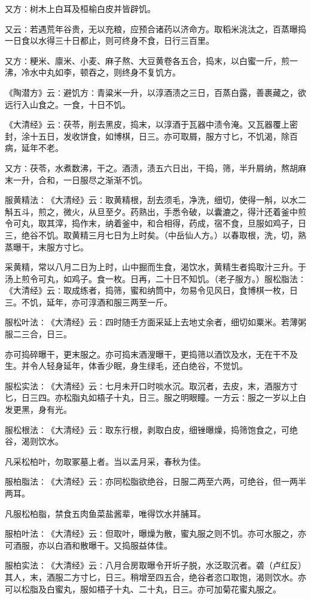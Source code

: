 \documentclass[a4paper,12pt,UTF8,twoside]{ctexbook}
\begin{document}
又方∶树木上白耳及桓榆白皮并皆辟饥。

又云∶若遇荒年谷贵，无以充粮，应预合诸药以济命方。取稻米洮汰之，百蒸曝捣一日食以水得三十日都止，则可终身不食，日行三百里。

又方∶粳米、廪米、小麦、麻子熬、大豆黄卷各五合，捣末，以白蜜一斤，煎一沸，冷水中丸如李，顿吞之，则终身不复饥方。

《陶潜方》云∶避饥方∶青粱米一升，以淳酒渍之三日，百蒸白露，善裹藏之，欲远行入山食之。一食，十日不饥。

《大清经》云∶茯苓，削去黑皮，捣末，以淳酒于瓦器中渍令淹。又瓦器覆上密封，涂十五日，发收饼食，如博棋，日三。亦可取屑，服方寸匕，不饥渴，除百病，延年不老。

又方∶茯苓，水煮数沸，干之。酒渍，渍五六日出，干捣，筛，半升屑纳，熬胡麻末一升，合和，一日服尽之渐渐不饥。

服黄精法∶《大清经》云∶取黄精根，刮去须毛，净洗，细切，使得一斛，以水二斛五斗，煎之，微火，从旦至夕。药熟出，手悉令破，以囊漉之，得汁还着釜中煎令可丸，取其滓，捣作末，纳着釜中，和合相得，药成，宿不食，旦服如鸡子，日三，绝谷不饥。取黄精三月七日为上时矣。（中岳仙人方。）以春取根，洗，切，熟蒸曝干，末服方寸匕。

采黄精，常以八月二日为上时，山中掘而生食，渴饮水，黄精生者捣取汁三升。于汤上煎令可丸，如鸡子。食一枚。日再，二十日不知饥。（老子服方。）服松脂法∶《大清经》云∶取成练者，捣筛，蜜和纳筒中，勿易令见风日，食博棋一枚，日三。不饥，延年，亦可淳酒和服三两至一斤。

服松叶法∶《大清经》云∶四时随壬方面采延上去地丈余者，细切如粟米。若薄粥服二三合，日三。

亦可捣碎曝干，更末服之。亦可捣末酒溲曝干，更捣筛以酒饮及水，无在干不及生。并令人轻身延年，体香少眠，身生绿毛，还白绝谷，不觉饥。

服松实法∶《大清经》云∶七月未开口时啖水沉。取沉者，去皮，末，酒服方寸匕，日三四。亦松脂丸如梧子十丸，日三。服之明眼瞳。一方云∶服之一岁以上白发更黑，身有光。

服松根法∶《大清经》云∶取东行根，剥取白皮，细锉曝燥，捣筛饱食之，可绝谷，渴则饮水。

凡采松柏叶，勿取冢墓上者。当以孟月采，春秋为佳。

服柏脂法∶《大清经》云∶亦同松脂欲绝谷，日服二两至六两，可绝谷，但一两半两耳。

凡服松柏脂，禁食五肉鱼菜盐酱辈，唯得饮水并脯耳。

服柏叶法∶《大清经》云∶但取叶，曝燥为散，蜜丸服之则不饥。亦可水服之，亦可酒服，亦以白酒和散曝干。又捣服益体佳。

服柏实法∶《大清经》云∶八月合房取曝令开圻子脱，水泛取沉者。砻（卢红反）其人，末，酒服二方寸匕，日三。稍增至四五合，绝谷者恣口取饱，渴则饮水。亦可以松脂及白蜜丸，服如梧子十丸、二十丸，日三。亦可加菊花蜜丸服之。
\end{document}

